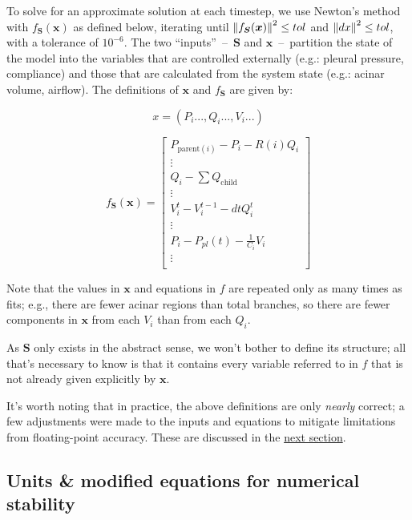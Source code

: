To solve for an approximate solution at each timestep, we use Newton's method with $f_{\bm{S}}(\bm{x})$ as
defined below, iterating until $\left\lVert f_{\bm{S}}(\bm{x})\right\rVert^2 \le tol$ and $\left\lVert dx\right\rVert^2 \le tol$, with
a tolerance of $10^{-6}$. The two ``inputs''~--~$\bm{S}$ and $\bm{x}$~--~partition the state of the
model into the variables that are controlled externally (e.g.: pleural pressure, compliance) and
those that are calculated from the system state (e.g.: acinar volume, airflow). The definitions of
$\bm{x}$ and $f_{\bm{S}}$ are given by:

\begin{equation*}
    x = (P_i..., Q_i..., V_i...)
\end{equation*}

\begin{equation*}
    f_{\bm{S}}(\bm{x}) =
        \begin{bmatrix}
            P_{\text{parent}(i)} - P_i - R(i)Q_i \\
            \vdots \\
            Q_i - \sum Q_{\text{child}} \\
            \vdots \\
            V_i^t - V_i^{t-1} - dtQ_i^t \\
            \vdots \\
            P_i - P_{pl}(t) - \frac{1}{C_i} V_i \\
            \vdots \\
        \end{bmatrix}
\end{equation*}

Note that the values in $\bm{x}$ and equations in $f$ are repeated only as many times as fits; e.g.,
there are fewer acinar regions than total branches, so there are fewer components in $\bm{x}$ from
each $V_i$ than from each $Q_i$.

As $\bm{S}$ only exists in the abstract sense, we won't bother to define its structure; all that's
necessary to know is that it contains every variable referred to in $f$ that is not already given
explicitly by $\bm{x}$.

\breakpars

It's worth noting that in practice, the above definitions are only \textit{nearly} correct; a few
adjustments were made to the inputs and equations to mitigate limitations from floating-point
accuracy. These are discussed in the \hyperref[sec:units-and-numerical-stability]{next section}.

\subsection{Units \& modified equations for numerical stability} \label{sec:units-and-numerical-stability}

